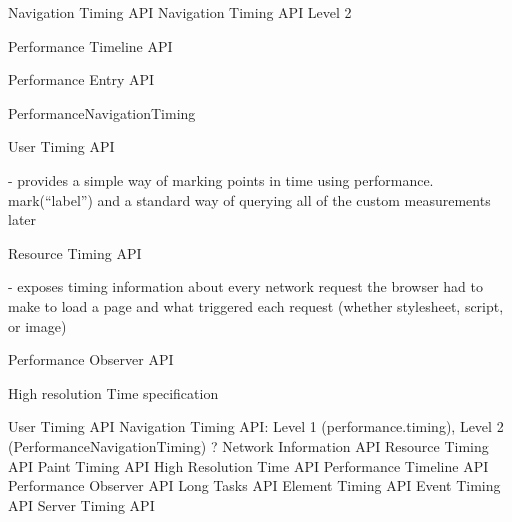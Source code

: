 Navigation Timing API %
Navigation Timing API Level 2 %






Performance Timeline API %





Performance Entry API %





PerformanceNavigationTiming %



User Timing API %

- provides a simple way of marking points in time using performance. mark(“label”) and a standard way of querying all of the custom measurements later




Resource Timing API %

- exposes timing information about every network request the browser had to make to load a page and what triggered each request (whether stylesheet, script, or image)




Performance Observer API %



High resolution Time specification






User Timing API
Navigation Timing API: Level 1 (performance.timing), Level 2 (PerformanceNavigationTiming) ?
Network Information API
Resource Timing API
Paint Timing API
High Resolution Time API
Performance Timeline API
Performance Observer API
Long Tasks API
Element Timing API
Event Timing API
Server Timing API
















